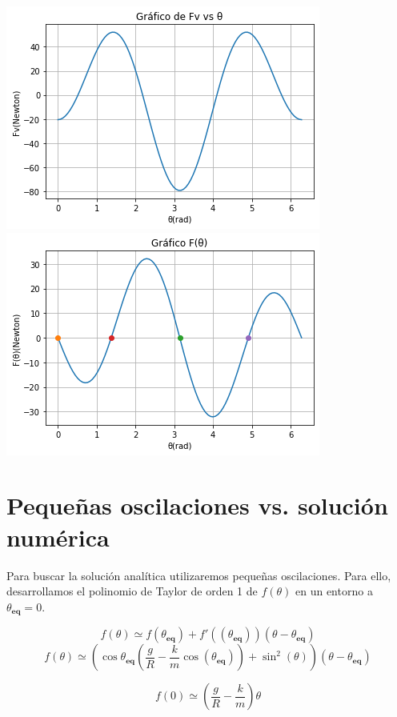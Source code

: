 \documentclass{article}
\begin{document}
	\begin{center}
		\includegraphics[scale=0.5]{01.png}
		\includegraphics[scale=0.5]{02.png}
	\end{center}

	\section{Pequeñas oscilaciones vs. soluci\'on num\'erica}
	
	Para buscar la soluci\'on anal\'itica utilizaremos pequeñas oscilaciones. Para ello, desarrollamos el polinomio de Taylor de orden 1 de $f(\theta)$ en un entorno a $\theta_{\textbf{eq}} = 0$.
	
	$$
		f(\theta) \simeq f(\theta_{\textbf{eq}}) + f'((\theta_{\textbf{eq}}))(\theta - \theta_{\textbf{eq}})
	$$
	\begin{equation}
	\label{eqn:taylor}
		f(\theta) \simeq (\cos{\theta_{\textbf{eq}}}(\frac{g}{R} - \frac{k}{m}\cos(\theta_{\textbf{eq}})) + \sin^2{(\theta)})(\theta - \theta_{\textbf{eq}})
	\end{equation}
	
	$$f(0) \simeq (\frac{g}{R} - \frac{k}{m})\theta$$
	
\end{document}
